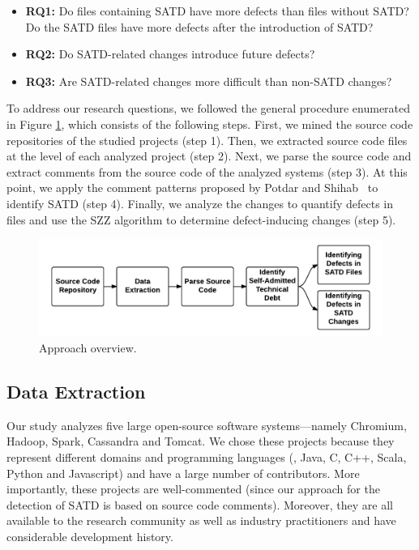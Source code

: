 \begin{itemize}
	\vspace{0.2cm}
	\item {\bf RQ1:} Do files containing SATD have more defects than files without SATD? Do the SATD files have more defects after the introduction of SATD?\\
	\item {\bf RQ2:} Do SATD-related changes introduce future defects?\\
	\item {\bf RQ3:} Are SATD-related changes more difficult than non-SATD changes?
\end{itemize}


To address our research questions, we followed the general procedure enumerated in Figure \ref{fig:Process_overview}, which consists of the following steps. First, we mined the source code repositories of the studied projects (step 1). Then, we extracted  source code files at the level of each analyzed project (step 2). Next, we parse the source code and extract comments from the source code of the analyzed systems (step 3). At this point, we apply the comment patterns proposed by Potdar and Shihab~\cite{ICSM_PotdarS14} to identify SATD (step 4). Finally, we analyze the changes to quantify defects in files and use the SZZ algorithm to determine defect-inducing changes (step 5).


\begin{figure}[t]
	\centering
	\includegraphics[width=150mm]{figures/chapter3/approach}
	\caption{Approach overview.}
	\label{fig:Process_overview}
\end{figure}


\subsection{Data Extraction}
Our study analyzes five large open-source software systems---namely Chromium, Hadoop, Spark, Cassandra and Tomcat. We chose these projects because they represent different domains and programming languages (\ie{}, Java, C, C++,  Scala, Python and Javascript) and have a large number of contributors. More importantly, these projects are well-commented (since our approach for the detection of SATD is based on source code comments). Moreover, they are all available to the research community as well as industry practitioners and have considerable development history.


